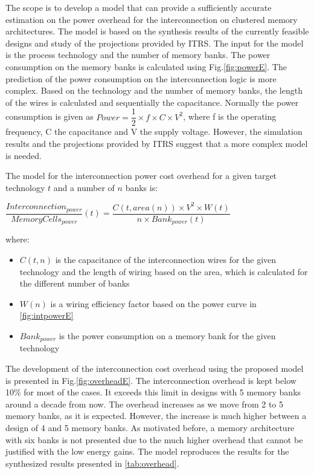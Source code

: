  The scope is to develop a model that can provide a sufficiently accurate estimation on the power overhead for the interconnection on clustered memory architectures.
 The model is based on the synthesis results of the currently feasible designs and study of the projections provided by ITRS.
 The input for the model is the process technology and the number of memory banks.
 The power consumption on the memory banks is calculated using Fig.\ref{fig:powerE}.
  The prediction of the power consumption on the interconnection logic is more complex.
 Based on the technology and the number of memory banks, the length of the wires is calculated and sequentially the capacitance.
 Normally the power consumption is given as  $Power = \dfrac{1}{2} \times f \times C \times V^{2} $, where  f is the operating frequency, C the capacitance and V the supply voltage.
 However, the simulation results and the projections provided by ITRS suggest that a more complex model is needed.
 
 The model for the interconnection power cost overhead for a given target technology $ t $ and a number of $ n $ banks is:
 
 \begin{center}
 $ \dfrac{Interconnection_{power}}{MemoryCells_{power}}(t) = \dfrac{C(t,area(n)) \times V^{2} \times W(t) }{n \times Bank_{power}(t)} $ 
  \end{center}
  
 where:

 \begin{itemize}
 \item $C(t,n)$ is the capacitance of the interconnection wires for the given technology and the length of wiring based on the area, which is calculated for the different number of banks
 \item $ W(n) $ is a wiring efficiency factor based on the power curve in \ref{fig:intpowerE}
 \item $ Bank_{power} $ is the power consumption on a memory bank for the given technology
 \end{itemize}
 
 The development of the interconnection cost overhead using the proposed model is presented in Fig.\ref{fig:overheadE}.
 The interconnection overhead is kept below 10\% for most of the cases.
 It exceeds this limit in designs with 5 memory banks around a decade from now.
 The overhead increases as we move from 2 to 5 memory banks, as it is expected.
 However, the increase is much higher between a design of 4 and 5 memory banks.
 As motivated before, a memory architecture with six banks is not presented due to the much higher overhead that cannot be justified with the low energy gains.
 The model reproduces the results for the synthesized results presented in \ref{tab:overhead}.
 

